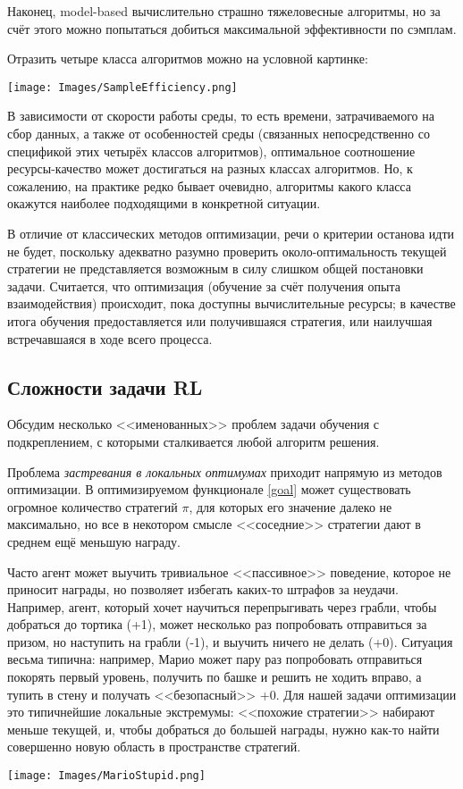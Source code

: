 Наконец, model-based вычислительно страшно тяжеловесные алгоритмы, но за счёт этого можно попытаться добиться максимальной эффективности по сэмплам. 

Отразить четыре класса алгоритмов можно на условной картинке:

\begin{center}
    \texttt{[image: Images/SampleEfficiency.png]}
\end{center}

В зависимости от скорости работы среды, то есть времени, затрачиваемого на сбор данных, а также от особенностей среды (связанных непосредственно со спецификой этих четырёх классов алгоритмов), оптимальное соотношение ресурсы-качество может достигаться на разных классах алгоритмов. Но, к сожалению, на практике редко бывает очевидно, алгоритмы какого класса окажутся наиболее подходящими в конкретной ситуации.

В отличие от классических методов оптимизации, речи о критерии останова идти не будет, поскольку адекватно разумно проверить около-оптимальность текущей стратегии не представляется возможным в силу слишком общей постановки задачи. Считается, что оптимизация (обучение за счёт получения опыта взаимодействия) происходит, пока доступны вычислительные ресурсы; в качестве итога обучения предоставляется или получившаяся стратегия, или наилучшая встречавшаяся в ходе всего процесса.

\subsection{Сложности задачи RL}\label{RLproblems}

Обсудим несколько <<именованных>> проблем задачи обучения с подкреплением, с которыми сталкивается любой алгоритм решения.

Проблема \emph{застревания в локальных оптимумах} приходит напрямую из методов оптимизации. В оптимизируемом функционале \eqref{goal} может существовать огромное количество стратегий $\pi$, для которых его значение далеко не максимально, но все в некотором смысле <<соседние>> стратегии дают в среднем ещё меньшую награду.

\begin{exampleBox}[righthand ratio=0.25, sidebyside, sidebyside align=center, lower separated=false]{}
Часто агент может выучить тривиальное <<пассивное>> поведение, которое не приносит награды, но позволяет избегать каких-то штрафов за неудачи. Например, агент, который хочет научиться перепрыгивать через грабли, чтобы добраться до тортика (+1), может несколько раз попробовать отправиться за призом, но наступить на грабли (-1), и выучить ничего не делать (+0). Ситуация весьма типична: например, Марио может пару раз попробовать отправиться покорять первый уровень, получить по башке и решить не ходить вправо, а тупить в стену и получать <<безопасный>> +0. Для нашей задачи оптимизации это типичнейшие локальные экстремумы: <<похожие стратегии>> набирают меньше текущей, и, чтобы добраться до большей награды, нужно как-то найти совершенно новую область в пространстве стратегий.

\tcblower
\texttt{[image: Images/MarioStupid.png]}
\end{exampleBox}


